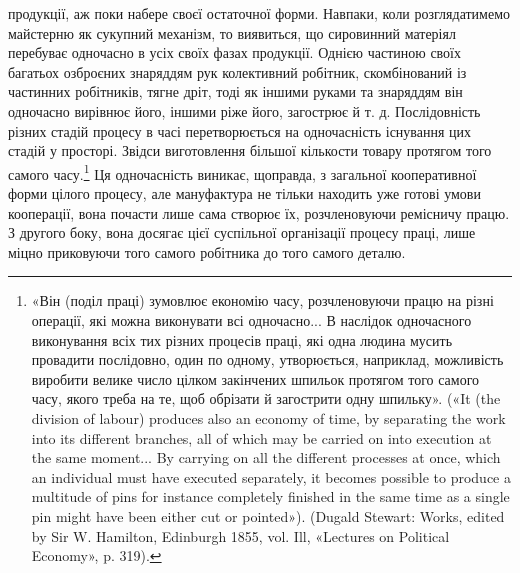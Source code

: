 \parcont{}  %
продукції, аж поки набере своєї остаточної форми. Навпаки, коли
розглядатимемо майстерню як сукупний механізм, то виявиться,
що сировинний матеріял перебуває одночасно в усіх своїх фазах
продукції. Однією частиною своїх багатьох озброєних знаряддям
рук колективний робітник, скомбінований із частинних робітників,
тягне дріт, тоді як іншими руками та знаряддям він одночасно
вирівнює його, іншими ріже його, загострює й т. д. Послідовність
різних стадій процесу в часі перетворюється на одночасність
існування цих стадій у просторі. Звідси виготовлення більшої
кількости товару протягом того самого часу.\footnote{
«Він (поділ праці) зумовлює економію часу, розчленовуючи
працю на різні операції, які можна виконувати всі одночасно... В наслідок
одночасного виконування всіх тих різних процесів праці, які одна
людина мусить провадити послідовно, один по одному, утворюється,
наприклад, можливість виробити велике число цілком закінчених
шпильок протягом того самого часу, якого треба на те, щоб обрізати й
загострити одну шпильку». («It (the division of labour) produces also
an economy of time, by separating the work into its different branches, all
of which may be carried on into execution at the same moment... By carrying
on all the different processes at once, which an individual must have
executed separately, it becomes possible to produce a multitude of pins
for instance completely finished in the same time as a single pin might
have been either cut or pointed»). (Dugald Stewart: Works, edited
by Sir W. Hamilton, Edinburgh 1855, vol. Ill, «Lectures on Political
Economy», p. 319).
} Ця одночасність
виникає, щоправда, з загальної кооперативної форми цілого
процесу, але мануфактура не тільки находить уже готові умови
кооперації, вона почасти лише сама створює їх, розчленовуючи
ремісничу працю. З другого боку, вона досягає цієї суспільної
організації процесу праці, лише міцно приковуючи того самого
робітника до того самого деталю.

